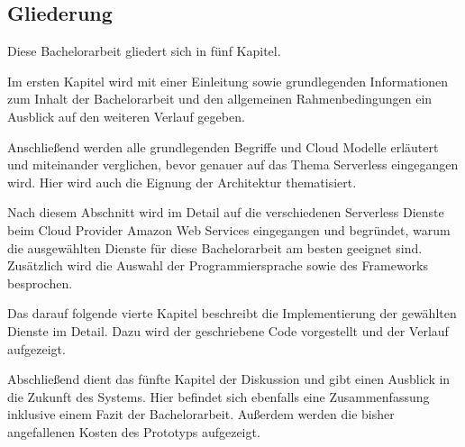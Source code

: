 \subsection{Gliederung}

Diese Bachelorarbeit gliedert sich in fünf Kapitel.

Im ersten Kapitel wird mit einer Einleitung sowie grundlegenden Informationen zum Inhalt der Bachelorarbeit und den allgemeinen Rahmenbedingungen ein Ausblick auf den weiteren Verlauf gegeben.

Anschließend werden alle grundlegenden Begriffe und Cloud Modelle erläutert und miteinander verglichen, bevor genauer auf das Thema Serverless eingegangen wird.
Hier wird auch die Eignung der Architektur thematisiert.

Nach diesem Abschnitt wird im Detail auf die verschiedenen Serverless Dienste beim Cloud Provider Amazon Web Services eingegangen und begründet, warum die ausgewählten Dienste für diese Bachelorarbeit am besten geeignet sind.
Zusätzlich wird die Auswahl der Programmiersprache sowie des Frameworks besprochen.

Das darauf folgende vierte Kapitel beschreibt die Implementierung der gewählten Dienste im Detail. Dazu wird der geschriebene Code vorgestellt und der Verlauf aufgezeigt.

Abschließend dient das fünfte Kapitel der Diskussion und gibt einen Ausblick in die Zukunft des Systems.
Hier befindet sich ebenfalls eine Zusammenfassung inklusive einem Fazit der Bachelorarbeit.
Außerdem werden die bisher angefallenen Kosten des Prototyps aufgezeigt.


